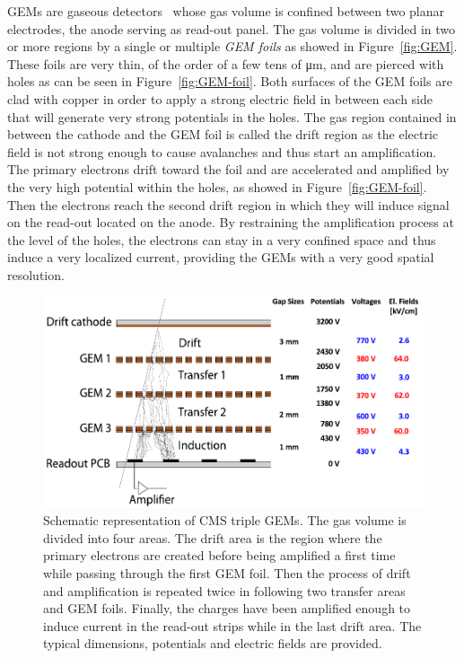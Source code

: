 	\acl{GEM}s are gaseous detectors~\cite{SAULI97} whose gas volume is confined between two planar electrodes, the anode serving as read-out panel. The gas volume is divided in two or more regions by a single or multiple \textit{GEM foils} as showed in Figure~\ref{fig:GEM}. These foils are very thin, of the order of a few tens of \si{\micro m}, and are pierced with holes as can be seen in Figure~\ref{fig:GEM-foil}. Both surfaces of the GEM foils are clad with copper in order to apply a strong electric field in between each side that will generate very strong potentials in the holes. The gas region contained in between the cathode and the GEM foil is called the drift region as the electric field is not strong enough to cause avalanches and thus start an amplification. The primary electrons drift toward the foil and are accelerated and amplified by the very high potential within the holes, as showed in Figure~\ref{fig:GEM-foil}. Then the electrons reach the second drift region in which they will induce signal on the read-out located on the anode. By restraining the amplification process at the level of the holes, the electrons can stay in a very confined space and thus induce a very localized current, providing the GEMs with a very good spatial resolution.
	
\endgroup

\begingroup\setlength{\intextsep}{5pt}\setlength{\columnsep}{15pt}

	\begin{figure}
		\vspace{-5mm}
		\centering
		\includegraphics[width=\linewidth]{fig/chapt3/GEM-drift.pdf}
		\caption{\label{fig:GEM-drift} Schematic representation of CMS triple GEMs. The gas volume is divided into four areas. The drift area is the region where the primary electrons are created before being amplified a first time while passing through the first GEM foil. Then the process of drift and amplification is repeated twice in following two transfer areas and GEM foils. Finally, the charges have been amplified enough to induce current in the read-out strips while in the last drift area. The typical dimensions, potentials and electric fields are provided.}
	\end{figure}
	
